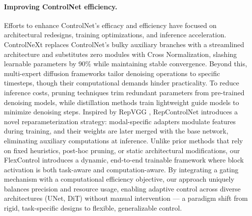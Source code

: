 \paragraph{Improving ControlNet efficiency.}
Efforts to enhance ControlNet’s efficacy and efficiency have focused on architectural redesigns, training optimizations, and inference acceleration. ControlNeXt \cite{peng2024controlnext} 
replaces ControlNet’s bulky auxiliary branches with a streamlined architecture and substitutes zero modules with Cross Normalization, slashing learnable parameters by 90\% while maintaining stable convergence. Beyond this, multi-expert diffusion frameworks \cite{lee2024multi, zhang2023improving} tailor denoising operations to specific timesteps, though their computational demands hinder practicality. To reduce inference costs, pruning techniques\cite{fang2023spdm, kim2023architectural, ganjdanesh2024not} trim redundant parameters from pre-trained denoising models, while distillation methods\cite{hsiao2024plug} train lightweight guide models to minimize denoising steps. Inspired by RepVGG  \cite{ding2021repvgg}, RepControlNet \cite{deng2024repcontrolnet} introduces a novel reparameterization strategy: modal-specific adapters modulate features during training, and their weights are later merged with the base network, eliminating auxiliary computations at inference. Unlike prior methods that rely on fixed heuristics, post-hoc pruning, or static architectural modifications, our FlexControl introduces a dynamic, end-to-end trainable framework where block activation is both task-aware and computation-aware. By integrating a gating mechanism with a computational efficiency objective, our approach uniquely balances precision and resource usage, enabling adaptive control across diverse architectures (UNet, DiT) without manual intervention — a paradigm shift from rigid, task-specific designs to flexible, generalizable control.
